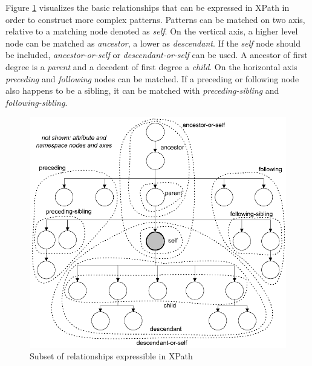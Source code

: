 \documentclass[english]{article}
\begin{document}

Figure \ref{fig:xpath} visualizes the basic relationships that can be expressed
in XPath in order to construct more complex patterns. Patterns can
be matched on two axis, relative to a matching node denoted as \textit{self}.
On the vertical axis, a higher level node can be matched as \textit{ancestor},
a lower as \textit{descendant}. If the \textit{self} node should be included, \textit{ancestor-or-self} or \textit{descendant-or-self} can be used. A ancestor of first degree is a \textit{parent}
and a decedent of first degree a \textit{child}. On the horizontal
axis \textit{preceding} and \textit{following} nodes can be matched.
If a preceding or following node also happens to be a sibling, it can be
matched with \textit{preceding-sibling} and \textit{following-sibling}.

\begin{figure}
\centering
\includegraphics[scale=0.35]{xpath-axis}
\caption{Subset of relationships expressible in XPath}
\label{fig:xpath}
\end{figure}
\end{document}
